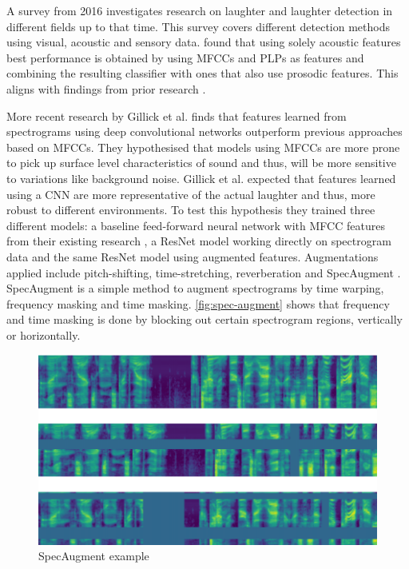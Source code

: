 \documentclass[bsc,frontabs,parskip,deptreport]{infthesis}
\begin{document}
A survey from 2016 \citep{cosentino2016quantitative} investigates research on laughter and laughter detection in different fields up to that time.
This survey covers different detection methods using visual, acoustic and sensory data.
\citet{cosentino2016quantitative} found that using solely acoustic features best performance is obtained by using MFCCs and PLPs as features and combining the resulting classifier with ones that also use prosodic features.
This aligns with findings from prior research \citep{truong2007automatic, knox2006automatic}.

More recent research by Gillick et al. \citep{gillick2021robust} finds that features learned from spectrograms using deep convolutional networks outperform previous approaches based on MFCCs.
They hypothesised that models using MFCCs are more prone to pick up surface level characteristics of sound and thus, will be more sensitive to variations like background noise.
Gillick et al. expected that features learned using a CNN are more representative of the actual laughter and thus, more robust to different environments. 
To test this hypothesis they trained three different models: a baseline feed-forward neural network with MFCC features from their existing research \citep{ryokai2018capturing}, a ResNet model working directly on spectrogram data and the same ResNet model using augmented features. Augmentations applied include pitch-shifting, time-stretching, reverberation and SpecAugment \citep{park2019specaugment}. SpecAugment is a simple method to augment spectrograms by time warping, frequency masking and time masking. \autoref{fig:spec-augment} shows that frequency and time masking is done by blocking out certain spectrogram regions, vertically or horizontally. 

\begin{figure}[h!]
    \centering
    \includegraphics[width=13cm]{imgs/examples/spec_augment_example.png}
    \caption{SpecAugment example}
    \label{fig:spec-augment}
\end{figure}
\end{document}

